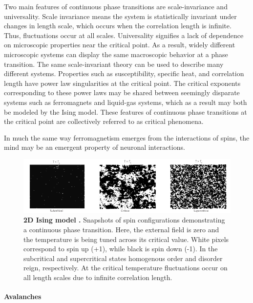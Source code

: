 \documentclass[12pt]{article}
\begin{document}
Two main features of continuous phase transitions are scale-invariance and universality. Scale invariance means the system is statistically invariant under changes in length scale, which occurs when the correlation length is infinite. Thus, fluctuations occur at all scales. Universality signifies a lack of dependence on microscopic properties near the critical point. As a result, widely different microscopic systems can display the same macroscopic behavior at a phase transition. The same scale-invariant theory can be used to describe many different systems. Properties such as susceptibility, specific heat, and correlation length have power law singularities at the critical point. The critical exponents corresponding to these power laws  may be shared between seemingly disparate systems such as ferromagnets and liquid-gas systems, which as a result may both be modeled by the Ising model. These features of continuous phase transitions at the critical point are collectively referred to as critical phenomena.

In much the same way ferromagnetism emerges from the interactions of spins, the mind may be an emergent property of neuronal interactions. 

\begin{figure}      
  \begin{center}    
 \includegraphics[width=1\textwidth]{Isingchialvo}    
    \caption{\textbf{2D Ising model \cite{Chialvo2010a}.} Snapshots of spin configurations demonstrating a continuous phase transition. Here, the external field is zero and the temperature is being tuned across its critical value. White pixels correspond to spin up (+1), while black is spin down (-1). In the subcritical and supercritical states homogenous order and disorder reign, respectively. At the critical temperature fluctuations occur on all length scales due to infinite correlation length.}  
   \label{Figure::Ising model criticality}   
  \end{center}     
   \end{figure}
 
\paragraph*{Avalanches}
\end{document}

